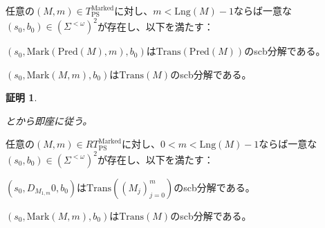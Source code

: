 \documentclass[dvipdfmx,uplatex]{jsarticle}
\theoremstyle{customnonumberbreakfortheorem}
\theoremstyle{customnonumberbreakforproof}
\newtheorem{hideableproof}{証明}
\begin{document}
\begin{corollary}\label{TransのMarkとPredによる表示}
	任意の\((M,m) \in T_{\textrm{PS}}^{\textrm{Marked}}\)に対し、\(m < \textrm{Lng}(M) - 1\)ならば一意な\((s_0,b_0) \in (\Sigma^{< \omega})^2\)が存在し、以下を満たす：
	\begin{penumerate}
		\item \((s_0,\textrm{Mark}(\textrm{Pred}(M),m),b_0)\)は\(\textrm{Trans}(\textrm{Pred}(M))\)のscb分解である。
		\item \((s_0,\textrm{Mark}(M,m),b_0)\)は\(\textrm{Trans}(M)\)のscb分解である。
	\end{penumerate}
\end{corollary}

\begin{hideableproof}
	\begin{indented}
		\item {}とから即座に従う。
	\end{indented}
\end{hideableproof}

\begin{corollary}\label{TransのMarkと切片による表示}
	任意の\((M,m) \in RT_{\textrm{PS}}^{\textrm{Marked}}\)に対し、\(0 < m < \textrm{Lng}(M) - 1\)ならば一意な\((s_0,b_0) \in (\Sigma^{< \omega})^2\)が存在し、以下を満たす：
	\begin{penumerate}
		\item \((s_0,D_{M_{1,m}} 0,b_0)\)は\(\textrm{Trans}((M_j)_{j=0}^{m})\)のscb分解である。
		\item \((s_0,\textrm{Mark}(M,m),b_0)\)は\(\textrm{Trans}(M)\)のscb分解である。
	\end{penumerate}
\end{corollary}
\end{document}
